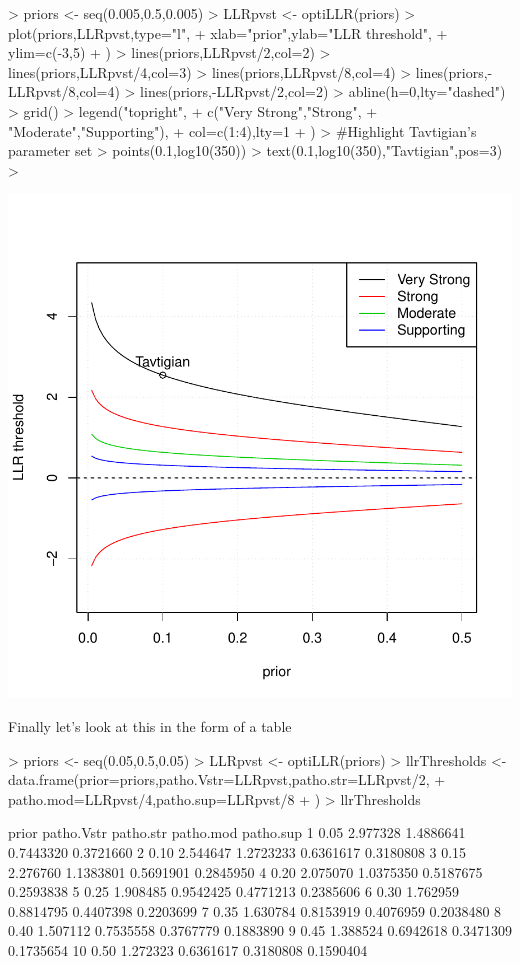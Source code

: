 \documentclass[12pt]{article}
\begin{document}
\begin{Schunk}
\begin{Sinput}
> priors <- seq(0.005,0.5,0.005)
> LLRpvst <- optiLLR(priors)
> plot(priors,LLRpvst,type="l",
+ 	xlab="prior",ylab="LLR threshold",
+ 	ylim=c(-3,5)
+ )
> lines(priors,LLRpvst/2,col=2)
> lines(priors,LLRpvst/4,col=3)
> lines(priors,LLRpvst/8,col=4)
> lines(priors,-LLRpvst/8,col=4)
> lines(priors,-LLRpvst/2,col=2)
> abline(h=0,lty="dashed")
> grid()
> legend("topright",
+ 	c("Very Strong","Strong",
+ 		"Moderate","Supporting"),
+ 	col=c(1:4),lty=1
+ )
> #Highlight Tavtigian's parameter set
> points(0.1,log10(350))
> text(0.1,log10(350),"Tavtigian",pos=3)
> 
\end{Sinput}
\end{Schunk}
\includegraphics{tavtigian-006}

Finally let's look at this in the form of a table

\begin{Schunk}
\begin{Sinput}
> priors <- seq(0.05,0.5,0.05)
> LLRpvst <- optiLLR(priors)
> llrThresholds <- data.frame(prior=priors,patho.Vstr=LLRpvst,patho.str=LLRpvst/2,
+   patho.mod=LLRpvst/4,patho.sup=LLRpvst/8
+ )
> llrThresholds
\end{Sinput}
\begin{Soutput}
   prior patho.Vstr patho.str patho.mod patho.sup
1   0.05   2.977328 1.4886641 0.7443320 0.3721660
2   0.10   2.544647 1.2723233 0.6361617 0.3180808
3   0.15   2.276760 1.1383801 0.5691901 0.2845950
4   0.20   2.075070 1.0375350 0.5187675 0.2593838
5   0.25   1.908485 0.9542425 0.4771213 0.2385606
6   0.30   1.762959 0.8814795 0.4407398 0.2203699
7   0.35   1.630784 0.8153919 0.4076959 0.2038480
8   0.40   1.507112 0.7535558 0.3767779 0.1883890
9   0.45   1.388524 0.6942618 0.3471309 0.1735654
10  0.50   1.272323 0.6361617 0.3180808 0.1590404
\end{Soutput}
\end{Schunk}
\end{document}
